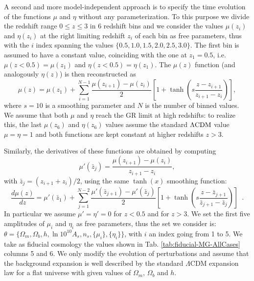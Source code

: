A second and more model-independent approach
is to specify the time evolution of the functions $\mu$ and $\eta$ without
any parameterization. To this purpose we divide the redshift
range $0\leq z\leq3$ in 6 redshift bins and we consider the values
$\mu(z_{i})$ and $\eta(z_{i})$ at the right limiting redshift $z_{i}$
of each bin as free parameters, thus with the $i$ index spanning the values
$\{0.5,1.0,1.5,2.0,2.5,3.0\}$. The first bin is assumed to have a constant 
value, coinciding with the one at $z_1=0.5$, i.e. $\mu(z<0.5)=\mu(z_{1})$ and $\eta(z<0.5)=\eta(z_{1})$.
The $\mu(z)$ function (and analogously $\eta(z)$) is then reconstructed
as 
\begin{equation}\label{eq:MGbin-mu-parametrization}
\mu(z)=\mu(z_{1})+\sum_{i=1}^{N-1}{\frac{\mu(z_{i+1})-\mu(z_{i})}{2}\left[1+\tanh{\left(s\frac{z-z_{i+1}}{z_{i+1}-z_{i}}\right)}\right]},
\end{equation}
where $s=10$ is a smoothing parameter and $N$ is the number of binned
values. We assume that both $\mu$ and $\eta$ reach the GR limit
at high redshifts: to realize this, the last $\mu(z_{6})$ and $\eta(z_{6})$
values assume the standard $\Lambda\mathrm{CDM}$ value $\mu=\eta=1$ and both functions
are kept constant at higher redshifts $z>3$.

Similarly, the derivatives of these functions are obtained by computing
\begin{equation}
\mu'({\bar{z}_{j}})=\frac{\mu(z_{i+1})-\mu(z_{i})}{z_{i+1}-z_{i}},
\end{equation}
with $\bar{z}_{j}=(z_{i+1}+z_{i})/2$, using the same $\tanh(x)$
smoothing function: 
\begin{equation}\label{eq:MGbin-muderiv-parametrization}
\frac{d\mu(z)}{dz}=\mu'(\bar{z}_{1})+\sum_{j=1}^{N-2}{\frac{\mu'(\bar{z}_{j+1})-\mu'(\bar{z}_{j})}{2}\left[1+\tanh{\left(s\frac{z-\bar{z}_{j+1}}{\bar{z}_{j+1}-\bar{z}_{j}}\right)}\right]}\,\,\,.
\end{equation}
In particular we assume $\mu'=\eta'=0$ for $z<0.5$ and for $z>3$.
We set the first five amplitudes of $\mu_{i}$ and $\eta_{i}$ as
free parameters, thus the set we consider is:
$\theta=\{\Omega_{m},\Omega_{b},h,\ln10^{10} A_{s},n_{s},\{\mu_{i}\},\{\eta_{i}\}\}$,
with $i$ an index going from 1 to 5. We take as fiducial cosmology
the values shown in Tab. \ref{tab:fiducial-MG-AllCases} columns 5
and 6. We only modify the evolution of perturbations and assume that
the background expansion is well described by the standard $\Lambda$CDM
expansion law for a flat universe with given values of $\Omega_{m}$,
$\Omega_{b}$ and $h$.




